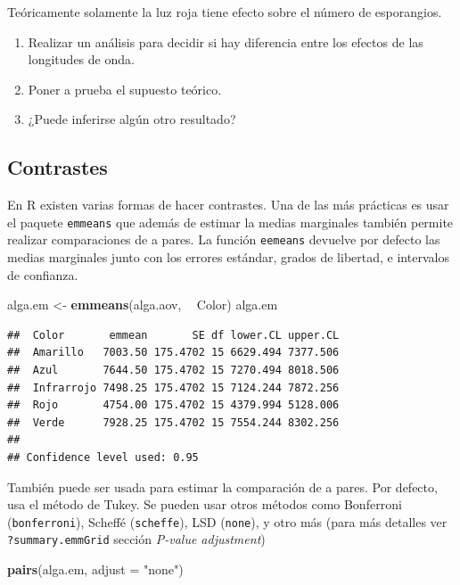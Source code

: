 \documentclass[]{book}
\newenvironment{Shaded}{\begin{snugshade}}{\end{snugshade}}
\newcommand{\DataTypeTok}[1]{\textcolor[rgb]{0.13,0.29,0.53}{#1}}
\newcommand{\KeywordTok}[1]{\textcolor[rgb]{0.13,0.29,0.53}{\textbf{#1}}}
\newcommand{\NormalTok}[1]{#1}
\newcommand{\OperatorTok}[1]{\textcolor[rgb]{0.81,0.36,0.00}{\textbf{#1}}}
\newcommand{\StringTok}[1]{\textcolor[rgb]{0.31,0.60,0.02}{#1}}
\providecommand{\tightlist}{%
  \setlength{\itemsep}{0pt}\setlength{\parskip}{0pt}}
\theoremstyle{definition}
\theoremstyle{definition}
\theoremstyle{definition}
\theoremstyle{remark}
\begin{document}
Teóricamente solamente la luz roja tiene efecto sobre el número de
esporangios.

\begin{enumerate}
\def\labelenumi{\alph{enumi})}
\tightlist
\item
  Realizar un análisis para decidir si hay diferencia entre los efectos
  de las longitudes de onda.
\item
  Poner a prueba el supuesto teórico.
\item
  ¿Puede inferirse algún otro resultado?
\end{enumerate}

\hypertarget{contrastes}{%
\subsection{Contrastes}\label{contrastes}}

En R existen varias formas de hacer contrastes. Una de las más prácticas
es usar el paquete \texttt{emmeans} que además de estimar la medias
marginales también permite realizar comparaciones de a pares. La función
\texttt{eemeans} devuelve por defecto las medias marginales junto con
los errores estándar, grados de libertad, e intervalos de confianza.

\begin{Shaded}
\begin{Highlighting}[]
\NormalTok{alga.em <-}\StringTok{ }\KeywordTok{emmeans}\NormalTok{(alga.aov, }\OperatorTok{~}\StringTok{ }\NormalTok{Color)}
\NormalTok{alga.em}
\end{Highlighting}
\end{Shaded}

\begin{verbatim}
##  Color       emmean       SE df lower.CL upper.CL
##  Amarillo   7003.50 175.4702 15 6629.494 7377.506
##  Azul       7644.50 175.4702 15 7270.494 8018.506
##  Infrarrojo 7498.25 175.4702 15 7124.244 7872.256
##  Rojo       4754.00 175.4702 15 4379.994 5128.006
##  Verde      7928.25 175.4702 15 7554.244 8302.256
## 
## Confidence level used: 0.95
\end{verbatim}

También puede ser usada para estimar la comparación de a pares. Por
defecto, usa el método de Tukey. Se pueden usar otros métodos como
Bonferroni (\texttt{bonferroni}), Scheffé (\texttt{scheffe}), LSD
(\texttt{none}), y otro más (para más detalles ver
\texttt{?summary.emmGrid} sección \emph{P-value adjustment})

\begin{Shaded}
\begin{Highlighting}[]
\KeywordTok{pairs}\NormalTok{(alga.em, }\DataTypeTok{adjust =} \StringTok{"none"}\NormalTok{)}
\end{Highlighting}
\end{Shaded}
\end{document}
